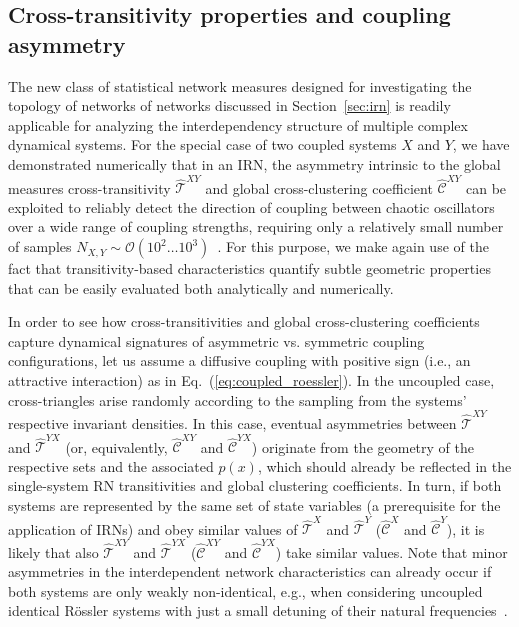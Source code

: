 \documentclass[graybox]{svmult}
\begin{document}
\subsection{Cross-transitivity properties and coupling asymmetry}\label{sec:coupling}

The new class of statistical network measures designed for investigating the topology of networks of networks discussed in Section~\ref{sec:irn} is readily applicable for analyzing the interdependency structure of multiple complex dynamical systems. For the special case of two coupled systems $X$ and $Y$, we have demonstrated numerically that in an IRN, the asymmetry intrinsic to the global measures cross-transitivity $\hat{\mathcal{T}}^{XY}$ and global cross-clustering coefficient $\hat{\mathcal{C}}^{XY}$ can be exploited to reliably detect the direction of coupling between chaotic oscillators over a wide range of coupling strengths, requiring only a relatively small number of samples $N_{X,Y}\sim\mathcal{O}(10^2\dots 10^3)$~\cite{Feldhoff2012}. For this purpose, we make again use of the fact that transitivity-based characteristics quantify subtle geometric properties that can be easily evaluated both analytically and numerically. 

In order to see how cross-transitivities and global cross-clustering coefficients capture dynamical signatures of asymmetric vs. symmetric coupling configurations, let us assume a diffusive coupling with positive sign (i.e., an attractive interaction) as in Eq.~(\ref{eq:coupled_roessler}). In the uncoupled case, cross-triangles arise randomly according to the sampling from the systems' respective invariant densities. In this case, eventual asymmetries between $\hat{\mathcal{T}}^{XY}$ and $\hat{\mathcal{T}}^{YX}$ (or, equivalently, $\hat{\mathcal{C}}^{XY}$ and $\hat{\mathcal{C}}^{YX}$) originate from the geometry of the respective sets and the associated $p(x)$, which should already be reflected in the single-system RN transitivities and global clustering coefficients. In turn, if both systems are represented by the same set of state variables (a prerequisite for the application of IRNs) and obey similar values of $\hat{\mathcal{T}}^{X}$ and $\hat{\mathcal{T}}^{Y}$ ($\hat{\mathcal{C}}^{X}$ and $\hat{\mathcal{C}}^{Y}$), it is likely that also $\hat{\mathcal{T}}^{XY}$ and $\hat{\mathcal{T}}^{YX}$ ($\hat{\mathcal{C}}^{XY}$ and $\hat{\mathcal{C}}^{YX}$) take similar values. Note that minor asymmetries in the interdependent network characteristics can already occur if both systems are only weakly non-identical, e.g., when considering uncoupled identical R\"ossler systems with just a small detuning of their natural frequencies~\cite{Feldhoff2012}.
\end{document}

